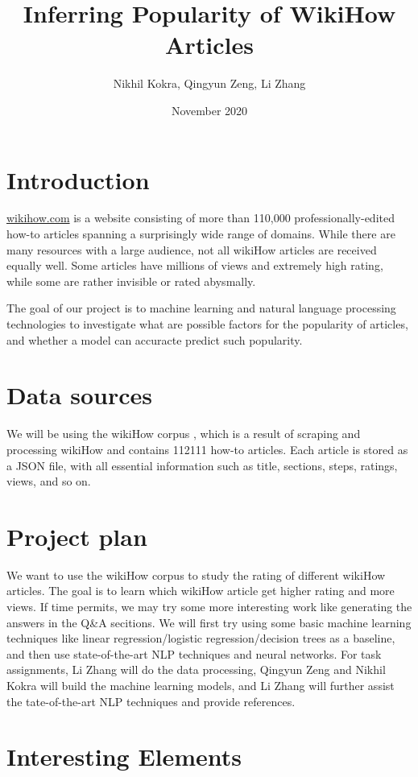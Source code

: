\documentclass{article}
\title{Inferring Popularity of WikiHow Articles}
\author{
Nikhil Kokra, Qingyun Zeng, Li Zhang}
\date{November 2020}
\begin{document}
\maketitle

\section{Introduction}
\url{wikihow.com} is a website consisting of more than 110,000 professionally-edited how-to articles spanning a surprisingly wide range of domains. While there are many resources with a large audience, not all wikiHow articles are received equally well. Some articles have millions of views and extremely high rating, while some are rather invisible or rated abysmally. 

The goal of our project is to machine learning and natural language processing technologies to investigate what are possible factors for the popularity of articles, and whether a model can accuracte predict such popularity.

\section{Data sources}
We will be using the wikiHow corpus \cite{zhang-etal-2020-reasoning}, which is a result of scraping and processing wikiHow and contains 112111 how-to articles. Each article is stored as a JSON file, with all essential information such as title, sections, steps, ratings, views, and so on. 

\section{Project plan}

We want to use the wikiHow corpus to study the rating of different wikiHow articles. The goal is to learn which wikiHow article get higher rating and more views. If time permits, we may try some more interesting work like generating the answers in the Q\&A secitions. We will first try using some basic machine learning techniques like linear regression/logistic regression/decision trees as a baseline, and then use state-of-the-art NLP techniques and neural networks. For task assignments, Li Zhang will do the data processing, Qingyun Zeng and Nikhil Kokra will build the machine learning models, and Li Zhang will further assist the tate-of-the-art NLP techniques and provide references.
\section{Interesting Elements}
\end{document}
